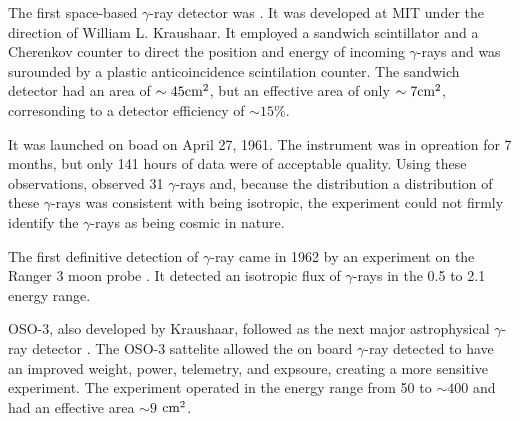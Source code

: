 The first space-based $\gamma$-ray detector was \explorerxi
\cite{kraushaar_1965_explorer-experiment}.  It was developed at \ac{MIT}
under the direction of William L. Kraushaar.  It employed a sandwich
scintillator and a Cherenkov counter to direct the position and energy
of incoming $\gamma$-rays and was surounded by a plastic anticoincidence
scintilation counter. The sandwich detector had an area of $\sim45\text{cm}^2$,
but an effective area of only $\sim 7\text{cm}^2$, corresonding
to a detector efficiency of $\sim 15\%$.


It was launched on boad \explorerxi on April 27,
1961. The instrument was in opreation for 7 months, but only 141 hours
of data were of acceptable quality.  Using these observations, \explorerxi
observed 31 $\gamma$-rays and, because the distribution a distribution of
these $\gamma$-rays was consistent with being isotropic, the experiment
could not firmly identify the $\gamma$-rays as being cosmic in nature.





The first definitive detection of $\gamma$-ray came in
1962 by an experiment on the Ranger 3 moon
probe \citep{arnold_1962_gamma-space}.  It detected an isotropic flux
of $\gamma$-rays in the 0.5 \mev to 2.1 \mev energy range.

\ac{OSO-3}, also developed by Kraushaar, followed \explorerxi
as the next major astrophysical $\gamma$-ray detector
\cite{kraushaar_1972_high-energy-cosmic}.  The \ac{OSO-3} sattelite
allowed the on board $\gamma$-ray detected to have an improved weight,
power, telemetry, and expsoure, creating a more sensitive experiment.
The experiment operated in the energy range from 50 \mev to $\sim 400$
\mev and had an effective area $\sim 9$ $\text{cm}^2$.


